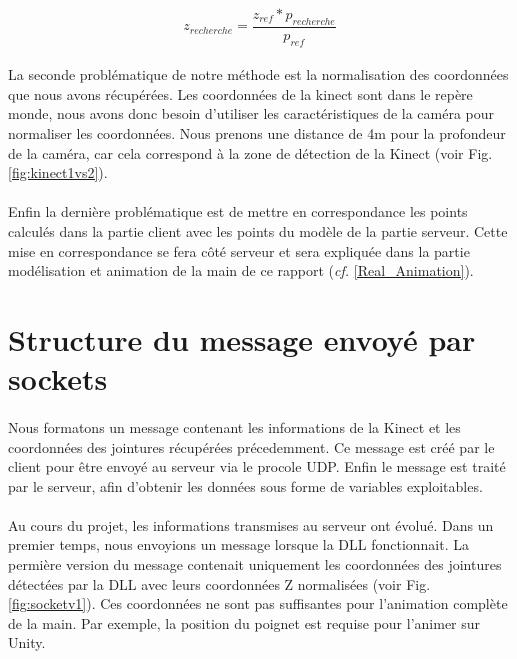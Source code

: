 \begin{equation}
 z_{recherche} = \frac{z_{ref} * p_{recherche}}{p_{ref}}
\end{equation}

\paragraph{}
La seconde problématique de notre méthode est la normalisation des coordonnées que nous avons récupérées. Les coordonnées
de la kinect sont dans le repère monde, nous avons donc besoin d'utiliser les caractéristiques de la caméra pour normaliser
les coordonnées. Nous prenons une distance de 4m pour la profondeur de la caméra, car cela correspond à la zone de détection de
la Kinect (voir Fig. \ref{fig:kinect1vs2}).

\paragraph{}
Enfin la dernière problématique est de mettre en correspondance les points calculés dans la partie client avec les points du modèle de la partie serveur. Cette mise en correspondance se fera côté serveur et sera expliquée dans la partie \og modélisation et animation de la main \fg de ce rapport (\textit{cf.} \ref{Real_Animation}).


\section{Structure du message envoyé par sockets}
\paragraph{}
Nous formatons un message contenant les informations de la 
Kinect et les coordonnées des jointures récupérées précedemment. Ce 
message est créé par le client pour être envoyé au serveur via le 
procole UDP. Enfin le message est traité par le serveur, afin d'obtenir 
les données sous forme de variables exploitables.

\paragraph{}
Au cours du projet, les informations transmises au serveur ont évolué. 
Dans un premier temps, nous envoyions un message lorsque la DLL fonctionnait. 
La permière version du message contenait uniquement les coordonnées des 
jointures détectées par la DLL avec leurs coordonnées Z normalisées (voir Fig. \ref{fig:socketv1}).
Ces coordonnées ne sont pas suffisantes pour l'animation complète de la 
main. Par exemple, la position du poignet est requise pour l'animer 
sur Unity.

